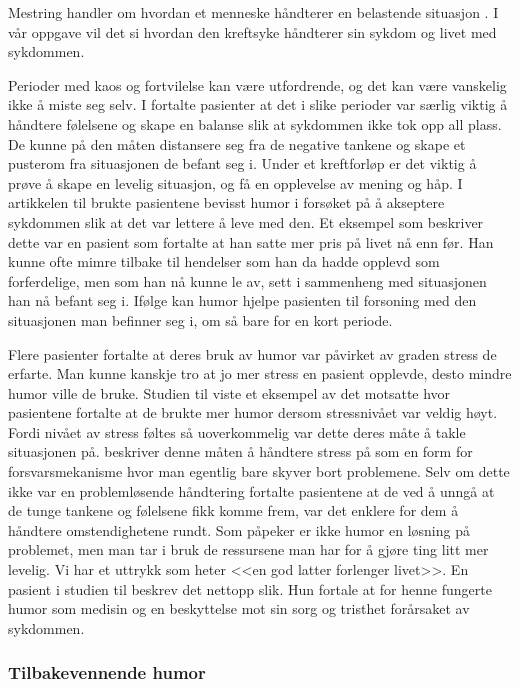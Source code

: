 Mestring handler om hvordan et menneske håndterer en belastende situasjon
\cite{reitan2006}. I vår oppgave vil det si hvordan den kreftsyke håndterer sin
sykdom og livet med sykdommen.

Perioder med kaos og fortvilelse kan være utfordrende, og det kan være
vanskelig ikke å miste seg selv. I  fortalte pasienter at
det i slike perioder var særlig viktig å håndtere følelsene og skape en balanse
slik at sykdommen ikke tok opp all plass. De kunne på den måten distansere seg
fra de negative tankene og skape et pusterom fra situasjonen de befant seg i.
Under et kreftforløp er det viktig å prøve å skape en levelig situasjon, og få
en opplevelse av mening og håp. I artikkelen til  brukte
pasientene bevisst humor i forsøket på å akseptere sykdommen slik at det var
lettere å leve med den. Et eksempel som beskriver dette var en pasient som
fortalte at han satte mer pris på livet nå enn før. Han kunne ofte mimre
tilbake til hendelser som han da hadde opplevd som forferdelige, men som han nå
kunne le av, sett i sammenheng med situasjonen han nå befant seg i. Ifølge
 kan humor hjelpe pasienten til forsoning med den situasjonen
man befinner seg i, om så bare for en kort periode.

Flere pasienter fortalte at deres bruk av humor var påvirket av graden stress
de erfarte. Man kunne kanskje tro at jo mer stress en pasient opplevde, desto
mindre humor ville de bruke. Studien til  viste et eksempel
av det motsatte hvor pasientene fortalte at de brukte mer humor dersom
stressnivået var veldig høyt. Fordi nivået av stress føltes så uoverkommelig
var dette deres måte å takle situasjonen på.  beskriver denne
måten å håndtere stress på som en form for forsvarsmekanisme hvor man egentlig
bare skyver bort problemene. Selv om dette ikke var en problemløsende
håndtering fortalte pasientene at de ved å unngå at de tunge tankene og
følelsene fikk komme frem, var det enklere for dem å håndtere omstendighetene
rundt. Som  påpeker er ikke humor en løsning på problemet,
men man tar i bruk de ressursene man har for å gjøre ting litt mer levelig. Vi
har et uttrykk som heter <<en god latter forlenger livet>>. En pasient i
studien til  beskrev det nettopp slik. Hun fortale at for
henne fungerte humor som medisin og en beskyttelse mot sin sorg og tristhet
forårsaket av sykdommen.

\subsubsection{Tilbakevennende humor}


